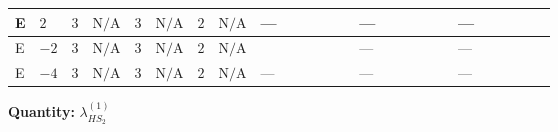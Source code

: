 \documentclass[8pt]{article}
\begin{document}
\begin{landscape}
\begin{longtable}{@{}llcccccc >{\raggedright\arraybackslash}p{0.21\linewidth} >{\raggedright\arraybackslash}p{0.21\linewidth} >{\raggedright\arraybackslash}p{0.21\linewidth}@{}}
\midrule
E & $2$ & $3$ & $\text{N/A}$ & $3$ & $\text{N/A}$ & $2$ & $\text{N/A}$ & --- & --- & --- \\
\midrule
E & $-2$ & $3$ & $\text{N/A}$ & $3$ & $\text{N/A}$ & $2$ & $\text{N/A}$ & \scriptsize\adjustbox{max width=\linewidth}{$\begin{gathered} +4 {\lambda_{X_{16}}} (5 \left({\lambda_{X_{2}}}\right)^{*}+4 \left({\lambda_{X_{16}}}\right)^{*})\end{gathered}$} & --- & --- \\
\midrule
E & $-4$ & $3$ & $\text{N/A}$ & $3$ & $\text{N/A}$ & $2$ & $\text{N/A}$ & --- & --- & --- \\
\midrule
\bottomrule
\end{longtable}
\clearpage
\noindent\textbf{Quantity: }$\lambda_{HS_2}^{(1)}$\par\smallskip

\end{landscape}
\end{document}
